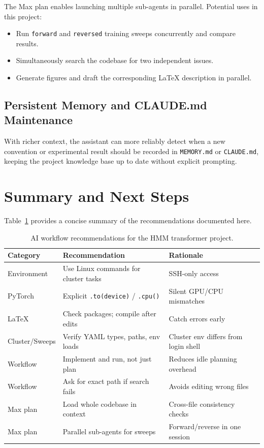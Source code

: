 \documentclass[11pt]{article}
\begin{document}
The Max plan enables launching multiple sub-agents in parallel.
Potential uses in this project:
\begin{itemize}[leftmargin=1.5em]
  \item Run \texttt{forward} and \texttt{reversed} training sweeps
        concurrently and compare results.
  \item Simultaneously search the codebase for two independent
        issues.
  \item Generate figures and draft the corresponding \LaTeX{}
        description in parallel.
\end{itemize}

\subsection{Persistent Memory and CLAUDE.md Maintenance}

With richer context, the assistant can more reliably detect when a new
convention or experimental result should be recorded in
\texttt{MEMORY.md} or \texttt{CLAUDE.md}, keeping the project
knowledge base up to date without explicit prompting.

\section{Summary and Next Steps}
\label{sec:summary}

Table~\ref{tab:recommendations} provides a concise summary of the
recommendations documented here.

\begin{table}[h]
\centering
\caption{AI workflow recommendations for the HMM transformer project.}
\label{tab:recommendations}
\begin{tabular}{lll}
\toprule
Category & Recommendation & Rationale \\
\midrule
Environment     & Use Linux commands for cluster tasks & SSH-only access \\
PyTorch         & Explicit \texttt{.to(device)} / \texttt{.cpu()} & Silent GPU/CPU mismatches \\
\LaTeX{}        & Check packages; compile after edits & Catch errors early \\
Cluster/Sweeps  & Verify YAML types, paths, env loads & Cluster env differs from login shell \\
Workflow        & Implement and run, not just plan & Reduces idle planning overhead \\
Workflow        & Ask for exact path if search fails & Avoids editing wrong files \\
Max plan        & Load whole codebase in context & Cross-file consistency checks \\
Max plan        & Parallel sub-agents for sweeps & Forward/reverse in one session \\
\bottomrule
\end{tabular}
\end{table}
\end{document}
